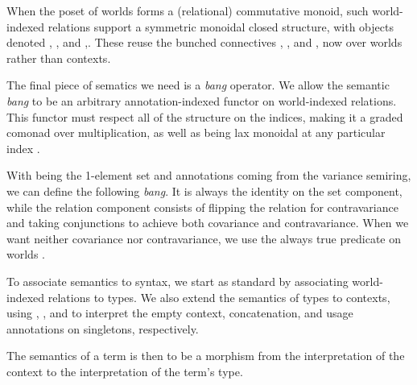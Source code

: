 
When the poset of worlds forms a (relational) commutative monoid, such
world-indexed relations support a symmetric monoidal closed structure, with
objects denoted ,
, and
,.
These reuse the bunched connectives , \AgdaRecord{$\sep$}, and
\AgdaRecord{$\wand$}, now over worlds rather than contexts.


The final piece of sematics we need is a \emph{bang} operator.
We allow the
semantic \emph{bang} to be an arbitrary annotation-indexed functor on
world-indexed relations.
This functor must respect all of the structure on the indices, making it a
graded comonad over multiplication, as well as being lax monoidal at any
particular index .


\begin{example}
  With  being the 1-element set and annotations coming from the
  variance semiring, we can define the following \emph{bang}.
  It is always the identity on the set component, while the relation component
  consists of flipping the relation for contravariance and taking conjunctions
  to achieve both covariance and contravariance.
  When we want neither covariance nor contravariance, we use the always true
  predicate on worlds .

\end{example}

To associate semantics to syntax, we start as standard by associating
world-indexed relations to types.
We also extend the semantics of types to contexts, using ,
, and  to interpret the empty
context, concatenation, and usage annotations on singletons, respectively.


The semantics of a term is then to be a morphism from the interpretation of the
context to the interpretation of the term's type.


